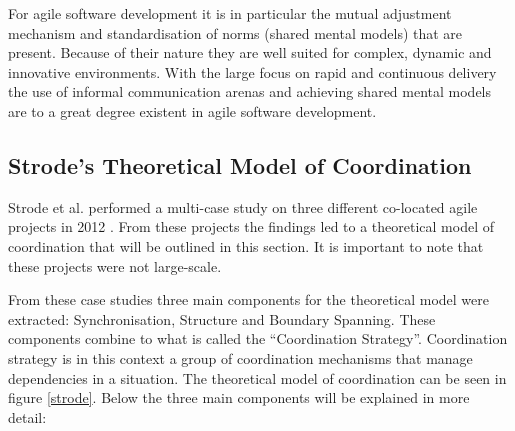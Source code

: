 For agile software development it is in particular the mutual adjustment mechanism and standardisation of norms (shared mental models) that are present. Because of their nature they are well suited for complex, dynamic and innovative environments. With the large focus on rapid and continuous delivery the use of informal communication arenas and achieving shared mental models are to a great degree existent in agile software development.

\subsection{Strode's Theoretical Model of Coordination}
\label{strodechap}

Strode et al. performed a multi-case study on three different co-located agile projects in 2012 \cite{Strode2012}. From these projects the findings led to a theoretical model of coordination that will be outlined in this section. It is important to note that these projects were not large-scale.

From these case studies three main components for the theoretical model were extracted: Synchronisation, Structure and Boundary Spanning. These components combine to what is called the ``Coordination Strategy''. Coordination strategy is in this context a group of coordination mechanisms that manage dependencies in a situation. The theoretical model of coordination can be seen in figure \ref{strode}. Below the three main components will be explained in more detail:

